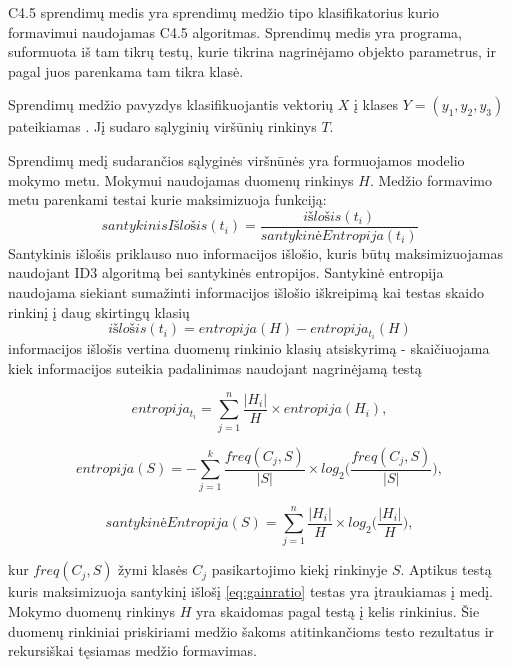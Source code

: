 C4.5 sprendimų medis yra sprendimų medžio tipo klasifikatorius kurio formavimui naudojamas C4.5 algoritmas.
Sprendimų medis yra programa, suformuota iš tam tikrų testų, kurie tikrina nagrinėjamo objekto parametrus,
ir pagal juos parenkama tam tikra klasė.


Sprendimų medžio pavyzdys klasifikuojantis vektorių $X$ į klases $Y = (y_1, y_2, y_3)$ pateikiamas
  . Jį sudaro sąlyginių viršūnių rinkinys $T$.

Sprendimų medį sudarančios sąlyginės viršnūnės yra formuojamos modelio mokymo metu. Mokymui naudojamas duomenų
rinkinys $H$. Medžio formavimo metu
parenkami testai kurie maksimizuoja funkciją:
\begin{equation} \label{eq:gainratio}
    santykinisIšlošis(t_i) = \frac{išlošis(t_i)}{santykinėEntropija(t_i)}
\end{equation}
Santykinis išlošis priklauso nuo informacijos išlošio, kuris būtų maksimizuojamas naudojant ID3
algoritmą bei santykinės entropijos. Santykinė entropija naudojama siekiant sumažinti informacijos
išlošio iškreipimą kai testas skaido rinkinį į daug skirtingų klasių \cite{c45}
\begin{equation}
    išlošis(t_i) = entropija(H) - entropija_{t_i}(H)
\end{equation}
informacijos išlošis vertina duomenų rinkinio klasių atsiskyrimą - skaičiuojama kiek informacijos
suteikia padalinimas naudojant nagrinėjamą testą

\begin{equation}
    entropija_{t_i} = \sum_{j=1}^{n} \frac{|H_i|}{H} \times entropija(H_i),
\end{equation}

\begin{equation}
    entropija(S) = - \sum_{j=1}^{k} \frac{freq(C_j, S)}{|S|} \times log_2 \big( \frac{freq(C_j, S)}{|S|} \big),
\end{equation}

\begin{equation}
    santykinėEntropija(S) =  \sum_{j=1}^{n} \frac{|H_i|}{H} \times log_2 \big( \frac{|H_i|}{H} \big),
\end{equation}

kur $freq(C_j, S)$ žymi klasės $C_j$ pasikartojimo kiekį rinkinyje $S$.
Aptikus testą kuris maksimizuoja santykinį išlošį \ref{eq:gainratio} testas yra įtraukiamas į medį.
Mokymo duomenų rinkinys $H$ yra skaidomas pagal testą į kelis rinkinius\cite{c45}. Šie duomenų
rinkiniai priskiriami medžio šakoms atitinkančioms testo rezultatus ir rekursiškai tęsiamas medžio formavimas.

